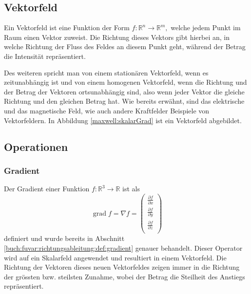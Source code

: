 \subsection{Vektorfeld\label{maxwell:vektorfeld}}

Ein Vektorfeld ist eine Funktion der Form \( f: \mathbb{R}^n \rightarrow \mathbb{R}^m, \) welche jedem Punkt im Raum einen Vektor zuweist. 
Die Richtung dieses Vektors gibt hierbei an, in welche Richtung der Fluss des Feldes an diesem Punkt geht, während der Betrag die Intensität repräsentiert.


Des weiteren spricht man von einem stationären Vektorfeld, wenn es zeitunabhängig ist und von einem homogenen Vektorfeld, wenn die Richtung und der Betrag der Vektoren ortsunabhängig sind, also wenn jeder Vektor die gleiche Richtung und den gleichen Betrag hat. 
Wie bereits erwähnt, sind das elektrische und das magnetische Feld, wie auch andere Kraftfelder Beispiele von Vektorfeldern.
In Abbildung \ref{maxwell:skalarGrad} ist ein Vektorfeld abgebildet.

\subsection{Operationen}

\subsubsection{Gradient}

Der Gradient einer Funktion $f:\mathbb{R}^3 \rightarrow \mathbb{R}$ ist als 
\[
\renewcommand{\arraystretch}{1.9} 
\operatorname{grad}f = \nabla f = \begin{pmatrix}
\displaystyle
\frac{\partial f}{\partial x} \\
\displaystyle
\frac{\partial f}{\partial y} \\
\displaystyle
\frac{\partial f}{\partial z} \\
\end{pmatrix}\] 
definiert und wurde bereits in Abschnitt \ref{buch:fuvar:richtungsableitung:def:gradient} genauer behandelt. Dieser Operator wird auf ein Skalarfeld angewendet und resultiert in einem Vektorfeld. 
Die Richtung der Vektoren dieses neuen Vektorfeldes zeigen immer in die Richtung der grössten bzw. steilsten Zunahme, wobei der Betrag die Steilheit des Anstiegs repräsentiert.

